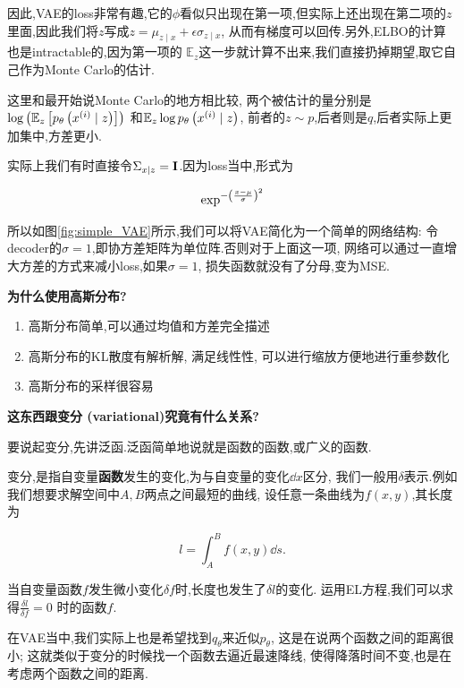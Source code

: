 	因此,VAE的loss非常有趣,它的$\phi$看似只出现在第一项,但实际上还出现在第二项的$z$
	里面,因此我们将$z$写成$z=\mu_{z \mid x}+\epsilon \sigma_{z \mid x}$,
	从而有梯度可以回传.另外,ELBO的计算也是intractable的,因为第一项的
	$\mathbb{E}_{z}$这一步就计算不出来,我们直接扔掉期望,取它自己作为Monte Carlo的估计.
	
	这里和最开始说Monte Carlo的地方相比较,
	两个被估计的量分别是$\log\left( \mathbb{E}_z \left[ p_{\theta} \left( x^{(i)}  \mid z\right)\right]\right)$
	和$\mathbb{E}_{z} \log p_{\theta} \left( x^{(i)}\mid z\right)$,
	前者的$z \sim p$,后者则是$q$,后者实际上更加集中,方差更小.
	
	实际上我们有时直接令$\Sigma_{x \mid z} = \bold{I}$.因为loss当中,形式为

	\begin{equation}
		\exp^{-\left( \frac{x - \mu}{\sigma}\right)^2}
	\end{equation}

	所以如图\ref{fig:simple_VAE}所示,我们可以将VAE简化为一个简单的网络结构:
	令decoder的$\sigma = 1$,即协方差矩阵为单位阵.否则对于上面这一项,
	网络可以通过一直增大方差的方式来减小loss,如果$\sigma = 1$,
	损失函数就没有了分母,变为MSE.

	\textbf{为什么使用高斯分布?}
	
	\begin{enumerate}
		\item 高斯分布简单,可以通过均值和方差完全描述
		\item 高斯分布的KL散度有解析解, 满足线性性, 可以进行缩放方便地进行重参数化
		\item 高斯分布的采样很容易
	\end{enumerate}
	
	\textbf{这东西跟变分 (variational)究竟有什么关系?}
	
	要说起变分,先讲泛函.泛函简单地说就是函数的函数,或广义的函数.

	变分,是指自变量\textbf{函数}发生的变化,为与自变量的变化$\dd x$区分,
	我们一般用$\delta$表示.例如我们想要求解空间中$A, B$两点之间最短的曲线,
	设任意一条曲线为$f(x, y)$,其长度为

	\begin{equation}
		l = \int_{A}^{B} f(x,  y) \dd s.
	\end{equation}

	当自变量函数$f$发生微小变化$\delta f$时,长度也发生了$\delta l$的变化.
	运用EL方程,我们可以求得$\frac{\delta l}{\delta f} = 0$
	时的函数$f$.
	
	在VAE当中,我们实际上也是希望找到$q_\theta$来近似$p_{\theta}$,
	这是在说两个函数之间的距离很小;
	这就类似于变分的时候找一个函数去逼近最速降线,
	使得降落时间不变,也是在考虑两个函数之间的距离.

